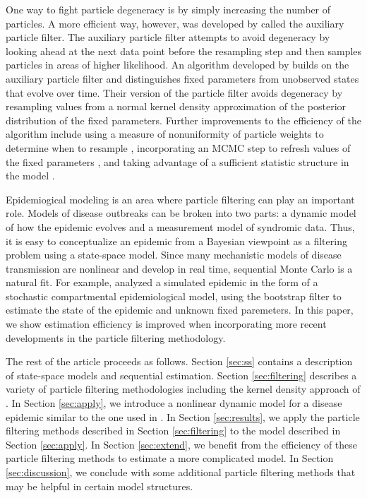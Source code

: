 \documentclass{elsarticle}
\begin{document}
One way to fight particle degeneracy is by simply increasing the number of particles. A more efficient way, however, was developed by \citet{Pitt:Shep:filt:1999} called the auxiliary particle filter. The auxiliary particle filter attempts to avoid degeneracy by looking ahead at the next data point before the resampling step and then samples particles in areas of higher likelihood. An algorithm developed by \citet{Liu:West:comb:2001} builds on the auxiliary particle filter and distinguishes fixed parameters from unobserved states that evolve over time. Their version of the particle filter avoids degeneracy by resampling values from a normal kernel density approximation of the posterior distribution of the fixed parameters. Further improvements to the efficiency of the algorithm include using a measure of nonuniformity of particle weights to determine when to resample \citep{Douc:Capp:Moul:comp:2005}, incorporating an MCMC step to refresh values of the fixed parameters \citep{Gilk:Berz:foll:2001}, and taking advantage of a sufficient statistic structure in the model \citep{Fear:mark:2002}.

Epidemiogical modeling is an area where particle filtering can play an important role. Models of disease outbreaks can be broken into two parts: a dynamic model of how the epidemic evolves and a measurement model of syndromic data. Thus, it is easy to conceptualize an epidemic from a Bayesian viewpoint as a filtering problem using a state-space model. Since many mechanistic models of disease transmission are nonlinear and develop in real time, sequential Monte Carlo is a natural fit. For example, \citet{skvortsov2012monitoring} analyzed a simulated epidemic in the form of a stochastic compartmental epidemiological model, using the bootstrap filter to estimate the state of the epidemic and unknown fixed paremeters. In this paper, we show estimation efficiency is improved when incorporating more recent developments in the particle filtering methodology.

The rest of the article proceeds as follows. Section \ref{sec:ss} contains a description of state-space models and sequential estimation. Section \ref{sec:filtering} describes a variety of particle filtering methodologies including the kernel density approach of \cite{Liu:West:comb:2001}. In Section \ref{sec:apply}, we introduce a nonlinear dynamic model for a disease epidemic similar to the one used in \citet{skvortsov2012monitoring}. In Section \ref{sec:results}, we apply the particle filtering methods described in Section \ref{sec:filtering} to the model described in Section \ref{sec:apply}. In Section \ref{sec:extend}, we benefit from the efficiency of these particle filtering methods to estimate a more complicated model. In Section \ref{sec:discussion}, we conclude with some additional particle filtering methods that may be helpful in certain model structures.
\end{document}
